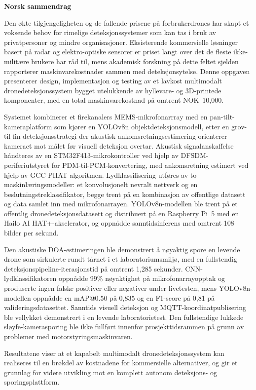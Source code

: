 \newpage
\textbf{Norsk sammendrag}

Den økte tilgjengeligheten og de fallende prisene på forbrukerdrones 
har skapt et voksende behov for rimelige deteksjonssystemer som kan 
tas i bruk av privatpersoner og mindre organisasjoner. Eksisterende 
kommersielle løsninger basert på radar og elektro-optiske sensorer er 
priset langt over det de fleste ikke-militære brukere har råd til, 
mens akademisk forskning på dette feltet sjelden rapporterer 
maskinvarekostnader sammen med deteksjonsytelse. Denne oppgaven 
presenterer design, implementasjon og testing av et lavkost multimodalt 
dronedeteksjonssystem bygget utelukkende av hyllevare- og 
3D-printede komponenter, med en total maskinvarekostnad på 
omtrent NOK~10,000.

Systemet kombinerer et firekanalers MEMS-mikrofonarrray med en 
pan-tilt-kameraplatform som kjører en YOLOv8n 
objektdeteksjonsmodell, etter en grov-til-fin deteksjonsstrategi 
der akustisk ankomsretningsestimering orienterer kameraet mot 
målet før visuell deteksjon overtar. Akustisk signalanskaffelse 
håndteres av en STM32F413-mikrokontroller ved hjelp av 
DFSDM-periferiutstyret for PDM-til-PCM-konvertering, med 
ankomsretning estimert ved hjelp av GCC-PHAT-algoritmen. 
Lydklassifisering utføres av to maskinlæringsmodeller: et 
konvolusjonelt nevralt nettverk og en beslutningstreklassifikator, 
begge trent på en kombinasjon av offentlige datasett og data samlet 
inn med mikrofonarrayen. YOLOv8n-modellen ble trent på et offentlig 
dronedeteksjonsdatasett og distribuert på en Raspberry Pi~5 med en 
Hailo AI HAT+-akselerator, og oppnådde sanntidsinferens med 
omtrent 108 bilder per sekund.

Den akustiske DOA-estimeringen ble demonstrert å nøyaktig spore en 
levende drone som sirkulerte rundt tårnet i et laboratoriumsmiljø, 
med en fullstendig deteksjonspipeline-iterasjonstid på omtrent 
1,285 sekunder. CNN-lydklassifikatoren oppnådde 99\% nøyaktighet 
på mikrofonarrayopptak og produserte ingen falske positiver eller 
negativer under livetesten, mens YOLOv8n-modellen oppnådde en 
mAP@0.50 på 0,835 og en F1-score på 0,81 på valideringsdatasettet. 
Sanntids visuell deteksjon og MQTT-koordinatpublisering ble 
vellykket demonstrert i en levende laboratorietest. Den fullstendige 
lukkede sløyfe-kamerasporing ble ikke fullført innenfor 
prosjekttidsrammen på grunn av problemer med motorstyringsmaskinvaren.

Resultatene viser at et kapabelt multimodalt dronedeteksjonssystem 
kan realiseres til en brøkdel av kostnadene for kommersielle 
alternativer, og gir et grunnlag for videre utvikling mot en 
komplett autonom deteksjons- og sporingsplattform.







